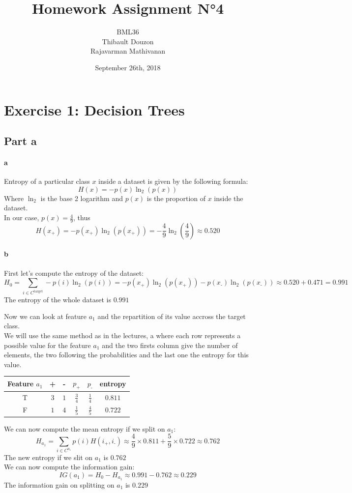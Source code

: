 \documentclass[a4paper, 10pt]{article}
\title{Homework Assignment N°4}
\author{BML36\\Thibault Douzon\\Rajavarman Mathivanan}
\date{September 26th, 2018}
\begin{document}
\maketitle

\pagebreak

\tableofcontents

\pagebreak
\section{Exercise 1: Decision Trees}
\subsection{Part a}
\paragraph{a}
Entropy of a particular class $x$ inside a dataset is given by the following formula:
$$
H(x) = -p(x)\ln_2(p(x))
$$
Where $\ln_2$ is the base 2 logarithm and $p(x)$ is the proportion of $x$ inside the dataset.
\\
In our case, $p(x) = \frac{4}{9}$, thus
$$
H(x_\text{+}) = -p(x_\text{+})\ln_2(p(x_\text{+})) = -\frac{4}{9}\ln_2(\frac{4}{9}) \approx 0.520
$$
\paragraph{b}
First let's compute the entropy of the dataset:
$$
H_0 = \sum_{i \in C^\text{target}} -p(i)\ln_2(p(i)) = -p(x_\text{+})\ln_2(p(x_\text{+})) -p(x_\text{-})\ln_2(p(x_\text{-}))
\approx 0.520 + 0.471 = 0.991
$$
The entropy of the whole dataset is $0.991$

Now we can look at feature $a_1$ and the repartition of its value accross the target class.
\\
We will use the same method as in the lectures, a  where each row represents a possible value
for the feature $a_1$ and the two firsts column give the number of elements, the two following the probabilities 
and the last one the entropy for this value.
\begin{center}
    \begin{tabular}{ |c|c|c|c|c|c| }
        \hline
        Feature $a_1$ & +      & -     & $p_\text{+}$ & $p_\text{-}$ & entropy\\
        \hline 
        T          & $3$    & $1$   & $\frac{3}{4}$ & $\frac{1}{4}$ & $0.811$\\
        \hline
        F          & $1$    & $4$   & $\frac{1}{5}$ & $\frac{4}{5}$ & $0.722$\\
        \hline
    \end{tabular}
\end{center}
We can now compute the mean entropy if we split on $a_1$:
$$
H_{a_1} = \sum_{i \in C^{a_1}} p(i)H(i_\text{+}, i_\text{-}) \approx \frac{4}{9}\times0.811 + \frac{5}{9}\times0.722 \approx 0.762
$$
The new entropy if we slit on $a_1$ is $0.762$
\\
We can now compute the information gain:
$$
IG(a_1) = H_0 - H_{a_1} \approx 0.991 - 0.762 \approx 0.229
$$
The information gain on splitting on $a_1$ is $0.229$
\end{document}
